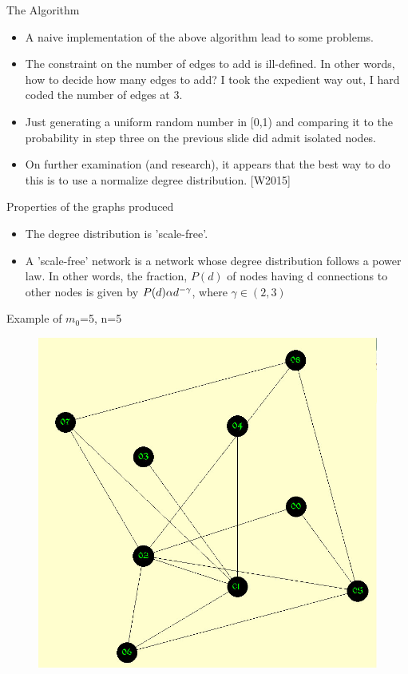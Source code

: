 \documentclass{beamer}
\begin{document}
\begin{frame}{The Algorithm}
\begin{itemize}
\item A na\:ive implementation of the above algorithm lead to some problems.
\item The constraint on the number of edges to add is ill-defined.  In other words, how to decide how many edges to add?  I took the 
expedient way out, I hard coded the number of edges at 3.
\item Just generating a uniform random number in [0,1) and comparing it to the probability in step three on the previous slide did admit isolated nodes.
\item On further examination (and research), it appears that the best way to do this is to use a normalize degree distribution. [W2015]
\end{itemize}
\end{frame}

\begin{frame}{Properties of the graphs produced}
\begin{itemize}
\item The degree distribution is 'scale-free'.
\item A 'scale-free' network is a network whose degree distribution follows a power law.  In other words, the fraction, $P(d)$ of nodes having d connections to other nodes is given by $P(d)\space \alpha \space d^{-\gamma}$, where $\gamma \in (2,3)$
\end{itemize}
\end{frame}

\begin{frame}{Example of $m_0$=5, n=5}
\begin{figure}
\includegraphics[width= .55\paperwidth]{BApic.jpg}
\end{figure}
\end{frame}
\end{document}
